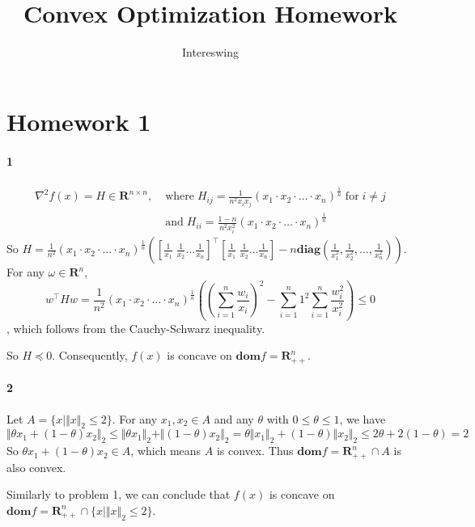 \documentclass{article}
\title{Convex Optimization Homework}
\author{Intereswing}
\begin{document}
\maketitle
\section{Homework 1}
\paragraph{1}
\begin{align*}
	\nabla^2 f(x) = H \in \mathbf{R}^{n\times n},\; &\mathrm{where} \; H_{ij} = \frac{1}{n^2 x_i x_j}(x_1\cdot x_2 \cdot\dots\cdot x_n)^{\frac{1}{n}}\; \mathrm{for}\; i\neq j\\
	&\mathrm{and}\; H_{ii} = \frac{1-n}{n^2 x_i^2}(x_1\cdot x_2 \cdot\dots\cdot x_n)^{\frac{1}{n}}
\end{align*}
So $H = \frac{1}{n^2}(x_1\cdot x_2 \cdot\dots\cdot x_n)^{\frac{1}{n}} ([\frac{1}{x_1}\; \frac{1}{x_2} \dots \frac{1}{x_n}]^\top[\frac{1}{x_1}\; \frac{1}{x_2} \dots \frac{1}{x_n}] - n\mathbf{diag}(\frac{1}{x_1^2}, \frac{1}{x_2^2}, \dots, \frac{1}{x_n^2}))$. For any $\omega \in \mathbf{R}^n$,
\[
w^\top Hw = \frac{1}{n^2}(x_1\cdot x_2 \cdot\dots\cdot x_n)^{\frac{1}{n}} ((\sum_{i=1}^n\frac{w_i}{x_i})^2 - \sum_{i=1}^n 1^2\sum_{i=1}^n \frac{w_i^2}{x_i^2})\leq 0
\]
, which follows from the Cauchy-Schwarz inequality.

So $H\preceq 0$. Consequently, $f(x)$ is concave on $\mathbf{dom}f = \mathbf{R}_{++}^n $.
	
\paragraph{2}
Let $A = \{x \mid \Vert x\Vert_2 \leq 2 \}$. For any $x_1, x_2 \in A$ and any $\theta$ with $0\leq \theta \leq 1$, we have
\[
\Vert\theta x_1+(1-\theta)x_2\Vert_2 \leq \Vert\theta x_1 \Vert_2 + \Vert(1-\theta) x_2 \Vert_2 = \theta \Vert x_1\Vert_2 + (1-\theta)\Vert x_2\Vert_2 \leq 2\theta+2(1-\theta) = 2
\]
So $\theta x_1+(1-\theta)x_2 \in A$, which means $A$ is convex. Thus $\mathbf{dom}f = \mathbf{R}_{++}^n \cap A$ is also convex.

Similarly to problem 1, we can conclude that $f(x)$ is concave on $\mathbf{dom}f = \mathbf{R}_{++}^n \cap \{x \mid \Vert x\Vert_2 \leq 2 \}$.



\pagebreak
\end{document}
